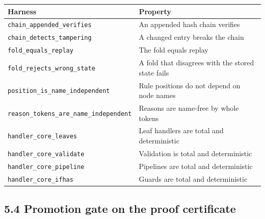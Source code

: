 \documentclass[10pt,letterpaper]{article}
\newcounter{none}
\begin{document}
{\def\LTcaptype{none} %
{\footnotesize\setlength{\tabcolsep}{3.8pt}\renewcommand{\arraystretch}{1.15}
\begin{longtable}[]{@{}
  >{\raggedright\arraybackslash}p{}
  >{\raggedright\arraybackslash}p{}@{}}
\toprule\noalign{}
\begin{minipage}[b]{\linewidth}\raggedright
\textbf{Harness}
\end{minipage} & \begin{minipage}[b]{\linewidth}\raggedright
\textbf{Property}
\end{minipage} \\
\midrule\noalign{}
\endhead
\bottomrule\noalign{}
\endlastfoot
\texttt{chain\_\allowbreak{}appended\_\allowbreak{}verifies} & An appended hash chain verifies \\
\texttt{chain\_\allowbreak{}detects\_\allowbreak{}tampering} & A changed entry breaks the chain \\
\texttt{fold\_\allowbreak{}equals\_\allowbreak{}replay} & The fold equals replay \\
\texttt{fold\_\allowbreak{}rejects\_\allowbreak{}wrong\_\allowbreak{}state} & A fold that disagrees with the
stored state fails \\
\texttt{position\_\allowbreak{}is\_\allowbreak{}name\_\allowbreak{}independent} & Rule positions do not depend
on node names \\
\texttt{reason\_\allowbreak{}tokens\_\allowbreak{}are\_\allowbreak{}name\_\allowbreak{}independent} & Reasons are name-free
by whole tokens \\
\texttt{handler\_\allowbreak{}core\_\allowbreak{}leaves} & Leaf handlers are total and
deterministic \\
\texttt{handler\_\allowbreak{}core\_\allowbreak{}validate} & Validation is total and
deterministic \\
\texttt{handler\_\allowbreak{}core\_\allowbreak{}pipeline} & Pipelines are total and
deterministic \\
\texttt{handler\_\allowbreak{}core\_\allowbreak{}ifhas} & Guards are total and deterministic \\
\end{longtable}
}
}

\subsection{5.4 Promotion gate on the proof
certificate}\label{promotion-gate-on-the-proof-certificate}
\end{document}
